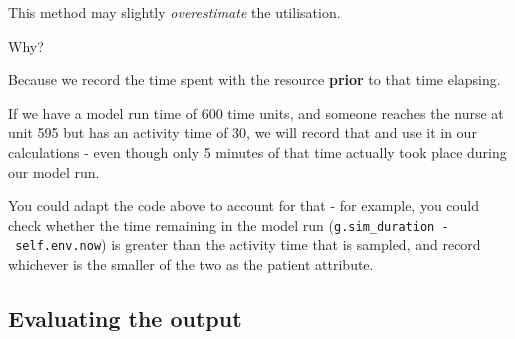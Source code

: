 \documentclass[
  letterpaper,
  DIV=11,
  numbers=noendperiod]{scrreprt}
\begin{document}
\begin{tcolorbox}[enhanced jigsaw, rightrule=.15mm, colback=white, colframe=quarto-callout-important-color-frame, colbacktitle=quarto-callout-important-color!10!white, toprule=.15mm, coltitle=black, opacityback=0, titlerule=0mm, bottomtitle=1mm, breakable, title=\textcolor{quarto-callout-important-color}{\faExclamation}\hspace{0.5em}{Important}, opacitybacktitle=0.6, toptitle=1mm, arc=.35mm, bottomrule=.15mm, leftrule=.75mm, left=2mm]

This method may slightly \emph{overestimate} the utilisation.

Why?

Because we record the time spent with the resource \textbf{prior} to
that time elapsing.

If we have a model run time of 600 time units, and someone reaches the
nurse at unit 595 but has an activity time of 30, we will record that
and use it in our calculations - even though only 5 minutes of that time
actually took place during our model run.

You could adapt the code above to account for that - for example, you
could check whether the time remaining in the model run
(\texttt{g.sim\_duration\ -\ self.env.now}) is greater than the activity
time that is sampled, and record whichever is the smaller of the two as
the patient attribute.

\end{tcolorbox}

\subsection{Evaluating the output}\label{evaluating-the-output}
\end{document}
